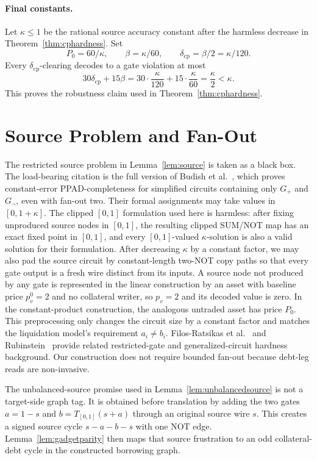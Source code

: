\documentclass{llncs}
\newcommand{\T}{T_{[0,1]}}
\begin{document}
\paragraph{Final constants.}
Let \(\kappa\le1\) be the rational source accuracy constant after the harmless decrease in Theorem~\ref{thm:cphardness}. Set
\[
        P_0=60/\kappa,\qquad \beta=\kappa/60,\qquad
        \delta_{\mathrm{cp}}=\beta/2=\kappa/120 .
\]
Every \(\delta_{\mathrm{cp}}\)-clearing decodes to a gate violation at most
\[
        30\delta_{\mathrm{cp}}+15\beta
        =30\cdot\frac{\kappa}{120}+15\cdot\frac{\kappa}{60}
        =\frac{\kappa}{2}<\kappa .
\]
This proves the robustness claim used in Theorem~\ref{thm:cphardness}.

\section{Source Problem and Fan-Out}
\label{app:source}
The restricted source problem in Lemma~\ref{lem:source} is taken as a black box. The load-bearing citation is the full version of Budish et al.~\cite[Appendix D.1, Definitions 10--11 and Theorem 3]{Budish2023}, which proves constant-error PPAD-completeness for simplified circuits containing only \(G_+\) and \(G_{\neg}\), even with fan-out two. Their formal assignments may take values in \([0,1+\kappa]\). The clipped \([0,1]\) formulation used here is harmless: after fixing unproduced source nodes in \([0,1]\), the resulting clipped SUM/NOT map has an exact fixed point in \([0,1]\), and every \([0,1]\)-valued \(\kappa\)-solution is also a valid solution for their formulation. After decreasing \(\kappa\) by a constant factor, we may also pad the source circuit by constant-length two-NOT copy paths so that every gate output is a fresh wire distinct from its inputs. A source node not produced by any gate is represented in the linear construction by an asset with baseline price \(p_v^0=2\) and no collateral writer, so \(p_v=2\) and its decoded value is zero. In the constant-product construction, the analogous untraded asset has price \(P_0\). This preprocessing only changes the circuit size by a constant factor and matches the liquidation model's requirement \(a_i\ne b_i\). Filos-Ratsikas et al.~\cite{FilosRatsikas2023} and Rubinstein~\cite{Rubinstein2018} provide related restricted-gate and generalized-circuit hardness background. Our construction does not require bounded fan-out because debt-leg reads are non-invasive.

The unbalanced-source promise used in Lemma~\ref{lem:unbalancedsource} is not a target-side graph tag. It is obtained before translation by adding the two gates \(a=1-s\) and \(b=\T(s+a)\) through an original source wire \(s\). This creates a signed source cycle \(s-a-b-s\) with one NOT edge. Lemma~\ref{lem:gadgetparity} then maps that source frustration to an odd collateral-debt cycle in the constructed borrowing graph.
\end{document}
